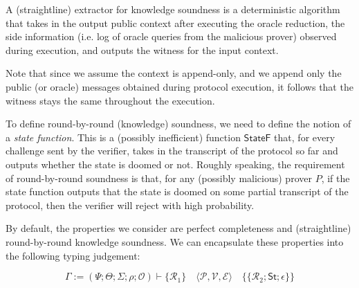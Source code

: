 A (straightline) extractor for knowledge soundness is a deterministic algorithm that takes in the output public context after executing the oracle reduction, the side information (i.e. log of oracle queries from the malicious prover) observed during execution, and outputs the witness for the input context.

Note that since we assume the context is append-only, and we append only the public (or oracle)
messages obtained during protocol execution, it follows that the witness stays the same throughout
the execution.

\begin{definition}
    \label{def:knowledge_soundness}
\end{definition}

To define round-by-round (knowledge) soundness, we need to define the notion of a \emph{state function}. This is a (possibly inefficient) function $\mathsf{StateF}$ that, for every challenge sent by the verifier, takes in the transcript of the protocol so far and outputs whether the state is doomed or not. Roughly speaking, the requirement of round-by-round soundness is that, for any (possibly malicious) prover $P$, if the state function outputs that the state is doomed on some partial transcript of the protocol, then the verifier will reject with high probability.

\begin{definition}
    \label{def:state_function}
\end{definition}

\begin{definition}
    \label{def:round_by_round_soundness}
\end{definition}

\begin{definition}
    \label{def:round_by_round_knowledge_soundness}
\end{definition}

By default, the properties we consider are perfect completeness and (straightline) round-by-round knowledge soundness. We can encapsulate these properties into the following typing judgement:

\[
    \Gamma := (\Psi; \Theta; \varSigma; \rho; \mathcal{O}) \vdash \{\mathcal{R}_1\} \quad \langle\mathcal{P}, \mathcal{V}, \mathcal{E}\rangle \quad \{\!\!\{\mathcal{R}_2; \mathsf{St}; \epsilon\}\!\!\}
\]
